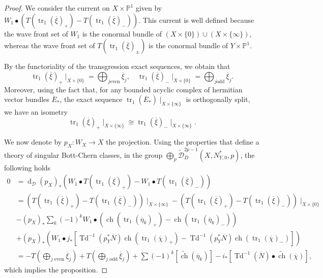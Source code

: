 \documentclass[10pt,twoside]{article}
\numberwithin{equation}{section}
\theoremstyle{plain}
\theoremstyle{definition}
\DeclareMathOperator{\tr}{tr}
\DeclareMathOperator{\Td}{Td}
\DeclareMathOperator{\dd}{d}
\DeclareMathOperator{\ch}{ch}
\begin{document}
\begin{proof}
  We consider the current on $X\times \mathbb{P}^{1}$ given by
  $W_{1} \bullet\left(T(\tr_{1}(\overline \xi)_{+})-T(\tr_{1}(\overline
  \xi)_{-})\right)$. This current is well 
  defined because the wave front set of $W_{1}$ is the conormal bundle
  of $(X\times \{0\})\cup (X\times \{\infty\})$, whereas the wave front
  set of $T(\tr_{1}(\overline \xi)_{\pm})$ is the conormal bundle of
  $Y\times \mathbb{P}^{1}$. 

  By the functoriality of the transgression exact sequences, we obtain
  that 
  \begin{displaymath}
    \tr_{1}(\overline \xi)_{+}\mid_{X\times \{0\}}=\bigoplus_{j\text{
      even} }\overline \xi_{j},\quad
    \tr_{1}(\overline \xi)_{-}\mid_{X\times \{0\}}=\bigoplus_{j\text{
      odd} }\overline \xi_{j}.
  \end{displaymath}
  Moreover, using the fact that, for any bounded acyclic complex of
  hermitian vector bundles $\overline E_{\ast}$, the exact sequence
  $\tr_{1}(\overline E_{\ast})\mid_{X\times \{\infty\}}$ is orthogonally
  split, we have an isometry 
  \begin{displaymath}
    \tr_{1}(\overline \xi)_{+}\mid_{X\times \{\infty\}}\cong
    \tr_{1}(\overline \xi)_{-}\mid_{X\times \{\infty\}}.
\end{displaymath}

We now denote by $p_{X}\colon W_{X}\longrightarrow X$ the projection. 
Using the properties that define a theory of singular Bott-Chern classes, in
the group $\bigoplus_{p}  \widetilde
{\mathcal{D}}^{2p-1}_{D}(X,N^{\ast}_{Y,0},p)$, the following holds
\begin{align*}
  0&=\dd_{\mathcal{D}} (p_{X})_{\ast} \left(W_{1} \bullet T(\tr_{1}(\overline
    \xi)_{+})-W_{1} \bullet T(\tr_{1}(\overline 
    \xi)_{-})\right)\\
  &=\left(T(\tr_{1}(\overline \xi)_{+})-T(\tr_{1}(\overline 
  \xi)_{-})\right)\mid _{X\times \{\infty\}}-
  \left(T(\tr_{1}(\overline
  \xi)_{+})-T(\tr_{1}(\overline 
  \xi)_{-})\right)\mid _{X\times \{0\}}\\
  &-(p_{X})_{\ast}\sum_{k}(-1)^{k}W_{1}\bullet
  \left(\ch(\tr_{1}(\overline \eta_{k})_{+})- \ch(\tr_{1}(\overline
    \eta_{k})_{-})\right)\\
  &+(p_{X})_{\ast}\left(W_{1}\bullet j_{\ast}\left[\Td^{-1}(p_{Y}^{\ast}\overline
    N)\ch(\tr_{1}(\overline \chi)_{+})-\Td^{-1}(p_{Y}^{\ast} \overline
    N)\ch(\tr_{1}(\overline \chi)_{-})\right]\right)\\
  &=  -T(\bigoplus_{j \text{ even} }\overline{\xi}_{j}) + T(\bigoplus
  _{j\text{ odd} }\overline {\xi}_j)+
\sum(-1)^{k} [\widetilde{\ch}(\overline \eta_{k})]-
  i_{\ast}[\Td^{-1}(\overline N)\bullet \widetilde{\ch}(\overline{\chi})],
\end{align*}
which implies the proposition.
\end{proof}
\end{document}

